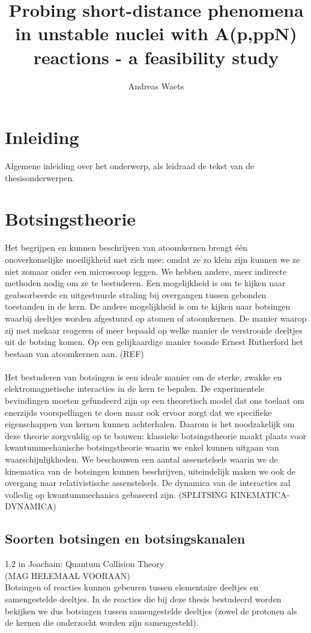 \documentclass[11pt]{article}
\title{Probing short-distance phenomena in unstable nuclei with A(p,ppN) reactions - a feasibility study}
\author{Andreas Waets}
\numberwithin{equation}{section}
\begin{document}
\maketitle
\section{Inleiding}
Algemene inleiding over het onderwerp, als leidraad de tekst van de thesisonderwerpen.
\newpage
\tableofcontents 
\newpage
\section{Botsingstheorie}
Het begrijpen en kunnen beschrijven van atoomkernen brengt \'e\'en onoverkomelijke moeilijkheid met zich mee: omdat ze zo klein zijn kunnen we ze niet zomaar onder een microscoop leggen. We hebben andere, meer indirecte methoden nodig om ze te bestuderen. Een mogelijkheid is om te kijken naar geabsorbeerde en uitgestuurde straling bij overgangen tussen gebonden toestanden in de kern. De andere mogelijkheid is om te kijken naar botsingen waarbij deeltjes worden afgestuurd op atomen of atoomkernen. De manier waarop zij met mekaar reageren of meer bepaald op welke manier de verstrooide deeltjes uit de botsing komen. Op een gelijkaardige manier toonde Ernest Rutherford het bestaan van atoomkernen aan. (REF)\\
\\
Het bestuderen van botsingen is een ideale manier om de sterke, zwakke en elektromagnetische interacties in de kern te bepalen. De experimentele bevindingen moeten gefundeerd zijn op een theoretisch model dat ons toelaat om enerzijds voorspellingen te doen maar ook ervoor zorgt dat we specifieke eigenschappen van kernen kunnen achterhalen. Daarom is het noodzakelijk om deze theorie zorgvuldig op te bouwen: klassieke botsingstheorie maakt plaats voor kwantummechanische botsingstheorie waarin we enkel kunnen uitgaan van waarschijnlijkheden. We beschouwen een aantal assenstelsels waarin we de kinematica van de botsingen kunnen beschrijven, uiteindelijk maken we ook de overgang naar relativistische assenstelsels. De dynamica van de interacties zal volledig op kwantummechanica gebaseerd zijn. (SPLITSING KINEMATICA-DYNAMICA)

\subsection{Soorten botsingen en botsingskanalen}\label{sec:Kanalen}
1.2 in Joachain: Quantum Collision Theory\\
(MAG  HELEMAAL VOORAAN)\\
Botsingen of reacties kunnen gebeuren tussen elementaire deeltjes en samengestelde deeltjes. In de reacties die bij deze thesis bestudeerd worden bekijken we dus botsingen tussen samengestelde deeltjes (zowel de protonen als de kernen die onderzocht worden zijn samengesteld).
\end{document}

